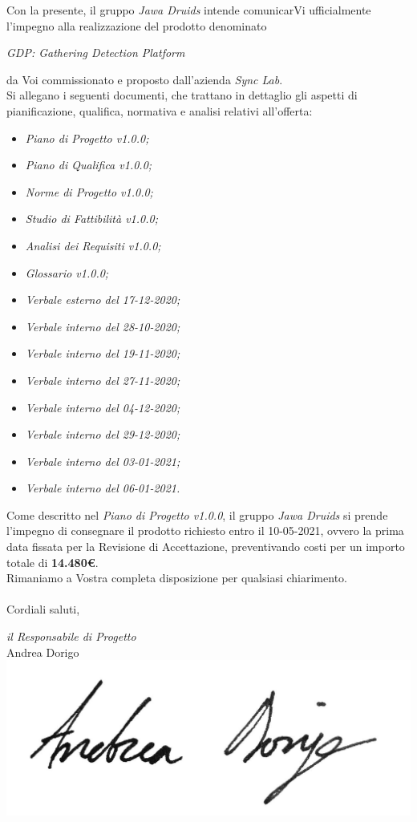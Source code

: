 \documentclass[a4paper,12pt]{report}
\begin{document}
Con la presente, il gruppo \textit{Jawa Druids} intende comunicarVi ufficialmente l’impegno alla realizzazione del prodotto denominato
\begin{center}
  \textit{GDP: Gathering Detection Platform}
\end{center}
da Voi commissionato e proposto dall'azienda \textit{Sync Lab}.
\vspace{1cm}
\\
Si allegano i seguenti documenti, che trattano in dettaglio gli aspetti di pianificazione, qualifica, normativa e analisi relativi all'offerta:
\begin{itemize}
  \item \textit{Piano di Progetto v1.0.0;}
  \item \textit{Piano di Qualifica v1.0.0;}
  \item \textit{Norme di Progetto v1.0.0;}
  \item \textit{Studio di Fattibilità v1.0.0;}
  \item \textit{Analisi dei Requisiti v1.0.0;}
  \item \textit{Glossario v1.0.0;}
  \item \textit{Verbale esterno del 17-12-2020;}
  \item \textit{Verbale interno del 28-10-2020;}
  \item \textit{Verbale interno del 19-11-2020;}
  \item \textit{Verbale interno del 27-11-2020;}
  \item \textit{Verbale interno del 04-12-2020;}
  \item \textit{Verbale interno del 29-12-2020;}
  \item \textit{Verbale interno del 03-01-2021;}
  \item \textit{Verbale interno del 06-01-2021.}
\end{itemize}
\vspace{0.7cm}

Come descritto nel \textit{Piano di Progetto v1.0.0}, il gruppo \textit{Jawa Druids} si prende l’impegno di consegnare il prodotto richiesto entro il 10-05-2021, ovvero la prima data fissata per la Revisione di Accettazione, preventivando costi per un importo totale di \textbf{14.480\euro}.\\
Rimaniamo a Vostra completa disposizione per qualsiasi chiarimento.\\
\vspace{0.3cm}
\\
Cordiali saluti,
\begin{flushright}
  \textit{il Responsabile di Progetto} \\
  Andrea Dorigo \\
  \includegraphics[width=0.3\linewidth]{immagini/firme/andrea_dorigo.jpg}\\[4ex]
\end{flushright}
\end{document}
